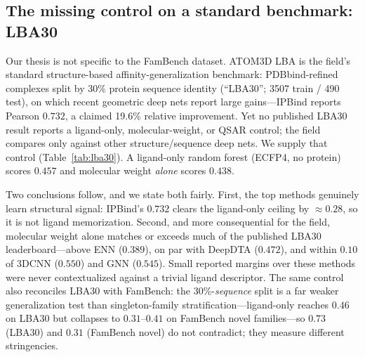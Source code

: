 \documentclass[11pt]{article}
\begin{document}
\subsection{The missing control on a standard benchmark: LBA30}
\label{sec:lba30}

Our thesis is not specific to the FamBench dataset. ATOM3D LBA \citep{townshend2021atom3d} is the
field's standard structure-based affinity-generalization benchmark: PDBbind-refined complexes split
by 30\% protein sequence identity (``LBA30''; 3507 train / 490 test), on which recent geometric
deep nets report large gains---IPBind \citep{li2025ipbind} reports Pearson $0.732$, a claimed 19.6\%
relative improvement. Yet no published LBA30 result reports a ligand-only, molecular-weight, or QSAR
control; the field compares only against other structure/sequence deep nets. We supply that control
(Table~\ref{tab:lba30}). A ligand-only random forest (ECFP4, no protein) scores $0.457$ and
molecular weight \emph{alone} scores $0.438$.

Two conclusions follow, and we state both fairly. First, the top methods genuinely learn structural
signal: IPBind's $0.732$ clears the ligand-only ceiling by $\approx 0.28$, so it is not ligand
memorization. Second, and more consequential for the field, molecular weight alone matches or
exceeds much of the published LBA30 leaderboard---above ENN ($0.389$), on par with DeepDTA
($0.472$), and within $0.10$ of 3DCNN ($0.550$) and GNN ($0.545$). Small reported margins over these
methods were never contextualized against a trivial ligand descriptor. The same control also
reconciles LBA30 with FamBench: the 30\%-\emph{sequence} split is a far weaker generalization test
than singleton-family stratification---ligand-only reaches $0.46$ on LBA30 but collapses to
$0.31$--$0.41$ on FamBench novel families---so $0.73$ (LBA30) and $0.31$ (FamBench novel) do not
contradict; they measure different stringencies.
\end{document}
